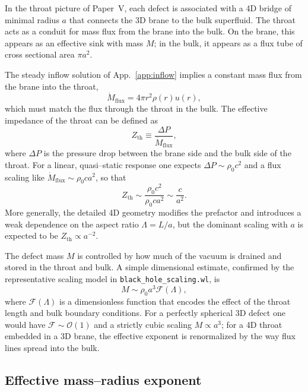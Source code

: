 \documentclass[11pt]{article}
\begin{document}
In the throat picture of Paper~V, each defect is associated with a 4D
bridge of minimal radius \(a\) that connects the 3D brane to the bulk
superfluid.  The throat acts as a conduit for mass flux from the brane into
the bulk.  On the brane, this appears as an effective sink with mass \(M\);
in the bulk, it appears as a flux tube of cross sectional area
\(\pi a^2\).

The steady inflow solution of App.~\ref{app:inflow} implies a constant mass
flux from the brane into the throat,
\begin{equation}
  \dot{M}_{\text{flux}}
  = 4\pi r^2 \rho(r) u(r),
\end{equation}
which must match the flux through the throat in the bulk.  The effective
impedance of the throat can be defined as
\begin{equation}
  Z_{\text{th}} \equiv \frac{\Delta P}{\dot{M}_{\text{flux}}},
  \label{eq:Zth-def}
\end{equation}
where \(\Delta P\) is the pressure drop between the brane side and the bulk
side of the throat.  For a linear, quasi--static response one expects
\(\Delta P \sim \rho_0 c^2\) and a flux scaling like \(\dot{M}_{\text{flux}}
\sim \rho_0 c a^2\), so that
\begin{equation}
  Z_{\text{th}}
  \sim \frac{\rho_0 c^2}{\rho_0 c a^2}
  \sim \frac{c}{a^2}.
\end{equation}
More generally, the detailed 4D geometry modifies the prefactor and
introduces a weak dependence on the aspect ratio \(\Lambda = L/a\), but the
dominant scaling with \(a\) is expected to be \(Z_{\text{th}} \propto a^{-2}\).

The defect mass \(M\) is controlled by how much of the vacuum is drained
and stored in the throat and bulk.  A simple dimensional estimate, confirmed
by the representative scaling model in \texttt{black\_hole\_scaling.wl}, is
\begin{equation}
  M \sim \rho_0 a^3 \mathcal{F}(\Lambda),
  \label{eq:M-a3-schematic}
\end{equation}
where \(\mathcal{F}(\Lambda)\) is a dimensionless function that encodes the
effect of the throat length and bulk boundary conditions.  For a perfectly
spherical 3D defect one would have \(\mathcal{F} \sim \mathcal{O}(1)\) and a
strictly cubic scaling \(M \propto a^3\); for a 4D throat embedded in a
3D brane, the effective exponent is renormalized by the way flux lines
spread into the bulk.

\subsection{Effective mass--radius exponent}
\label{app:impedance-exponent}
\end{document}
